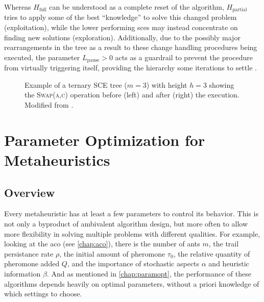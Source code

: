 Whereas $H_\text{full}$ can be understood as a complete reset of the algorithm, $H_\text{partial}$ tries to apply some of the best \enquote{knowledge} to solve this changed problem (exploitation), while the lower performing \glspl{sce} may instead concentrate on finding new solutions (exploration). Additionally, due to the possibly major rearrangements in the tree as a result to these change handling procedures being executed, the parameter $L_\text{pause} > 0$ acts as a guardrail to prevent the procedure from virtually triggering itself, providing the hierarchy some iterations to settle \cite{kupfer2021hierarchical}.

\begin{figure}
\centering
{}
	\caption[Example of a ternary SCE tree showing a swap operation]{Example of a ternary SCE tree ($m = 3$) with height $h = 3$ showing the \textsc{Swap(a,c)} operation before (left) and after (right) the execution. Modified from \citet{kupfer2021hierarchical}.}
	\label{fig:ternary-tree}
\end{figure}



\section{Parameter Optimization for Metaheuristics}

\subsection{Overview}

Every metaheuristic has at least a few parameters to control its behavior. This is not only a byproduct of ambivalent algorithm design, but more often to allow more flexibility in solving multiple problems with different qualities. For example, looking at the \gls{aco} (see \ref{chap:aco}), there is the number of ants $m$, the trail persistance rate $\rho$, the initial amount of pheromone $\tau_0$, the relative quantity of pheromone added $Q$, and the importance of stochastic aspects $\alpha$ and heuristic information $\beta$. And as mentioned in \cref{chap:paramopt}, the performance of these algorithms depends heavily on optimal parameters, without a priori knowledge of which settings to choose.

